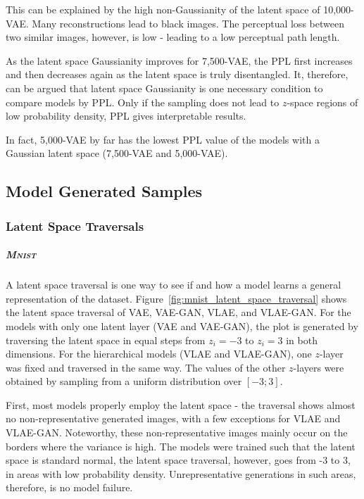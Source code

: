 This can be explained by the high non-Gaussianity of the latent space of 10,000-\ac{VAE}.
Many reconstructions lead to black images.
The perceptual loss between two similar images, however, is low - leading to a low perceptual path length.

As the latent space Gaussianity improves for 7,500-\ac{VAE}, the \ac{PPL} first increases and then decreases again as the latent space is truly disentangled.
It, therefore, can be argued that latent space Gaussianity is one necessary condition to compare models by \ac{PPL}.
Only if the sampling does not lead to $z$-space regions of low probability density, \ac{PPL} gives interpretable results.

In fact, 5,000-\ac{VAE} by far has the lowest \ac{PPL} value of the models with a Gaussian latent space (7,500-\ac{VAE} and 5,000-\ac{VAE}).

\subsection{Model Generated Samples}\label{subsec:model-generated-samples}

\subsubsection{Latent Space Traversals}\label{subsubsec:latent_space_traversals}

\subparagraph{\textsc{Mnist}}

A latent space traversal is one way to see if and how a model learns a general representation of the dataset.
Figure~\ref{fig:mnist_latent_space_traversal} shows the latent space traversal of \ac{VAE}, \ac{VAE}-\ac{GAN}, \ac{VLAE}, and \ac{VLAE}-\ac{GAN}.
For the models with only one latent layer (\ac{VAE} and \ac{VAE}-\ac{GAN}), the plot is generated by traversing the latent space in equal steps from $z_i = -3$ to $z_i = 3$ in both dimensions.
For the hierarchical models (\ac{VLAE} and \ac{VLAE}-\ac{GAN}), one $z$-layer was fixed and traversed in the same way.
The values of the other $z$-layers were obtained by sampling from a uniform distribution over $[-3; 3]$.

First, most models properly employ the latent space - the traversal shows almost no non-representative generated images, with a few exceptions for \ac{VLAE} and \ac{VLAE}-\ac{GAN}.
Noteworthy, these non-representative images mainly occur on the borders where the variance is high.
The models were trained such that the latent space is standard normal, the latent space traversal, however, goes from -3 to 3, in areas with low probability density.
Unrepresentative generations in such areas, therefore, is no model failure.

